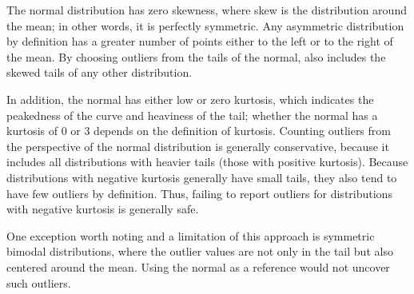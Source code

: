 The normal distribution has zero skewness, where skew is the
distribution around the mean; in other words, it is perfectly
symmetric. Any asymmetric distribution by definition has a greater
number of points either to the left or to the right of the mean. By
choosing outliers from the tails of the normal, \checkcell{} also
includes the skewed tails of any other distribution.

In addition, the normal has either low or zero kurtosis, which
indicates the peakedness of the curve and heaviness of the tail;
whether the normal has a kurtosis of 0 or 3 depends on the definition
of kurtosis. Counting outliers from the perspective of the normal
distribution is generally conservative, because it includes all
distributions with heavier tails (those with positive
kurtosis). Because distributions with negative kurtosis generally have
small tails, they also tend to have few outliers by definition. Thus,
failing to report outliers for distributions with negative kurtosis is
generally safe.

One exception worth noting and a limitation of this approach is
symmetric bimodal distributions, where the outlier values are not only
in the tail but also centered around the mean. Using the normal as a
reference would not uncover such outliers.

